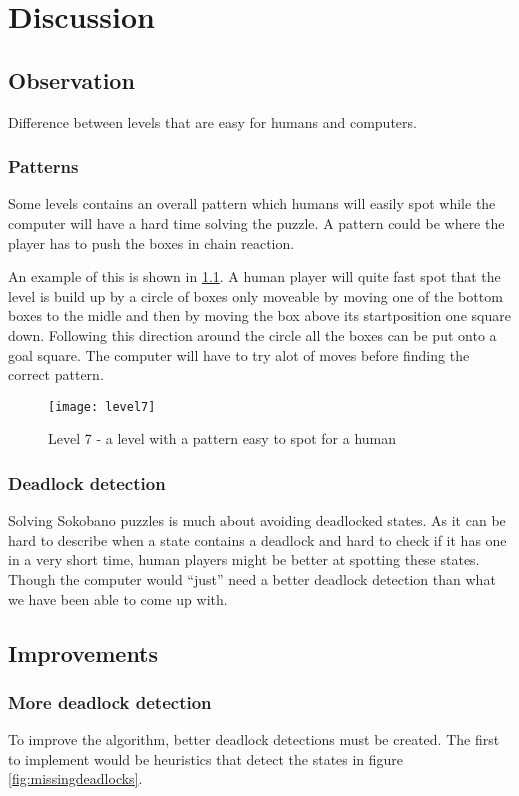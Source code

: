 
\chapter{Discussion}
\label{cha:discussion}

\section{Observation}
Difference between levels that are easy for humans and computers.

\subsection{Patterns}
Some levels contains an overall pattern which humans will easily spot while the computer will have a hard time solving the puzzle. A pattern could be where the player has to push the boxes in chain reaction.

An example of this is shown in \ref{fig:level7}. A human player will quite fast spot that the level is build up by a circle of boxes only moveable by moving one of the bottom boxes to the midle and then by moving the box above its startposition one square down. Following this direction around the circle all the boxes can be put onto a goal square. The computer will have to try alot of moves before finding the correct pattern.

\begin{figure}[htp]
	\centering
	\texttt{[image: level7]}
	\caption{Level 7 - a level with a pattern easy to spot for a human}
	\label{fig:level7}
\end{figure}

\subsection{Deadlock detection}
Solving Sokobano puzzles is much about avoiding deadlocked states. As it can be hard to describe when a state contains a deadlock and hard to check if it has one in a very short time, human players might be better at spotting these states. Though the computer would ``just'' need a better deadlock detection than what we have been able to come up with.

\section{Improvements}
\subsection{More deadlock detection}
To improve the algorithm, better deadlock detections must be
created. The first to implement would be heuristics that detect the
states in figure \ref{fig:missingdeadlocks}.

